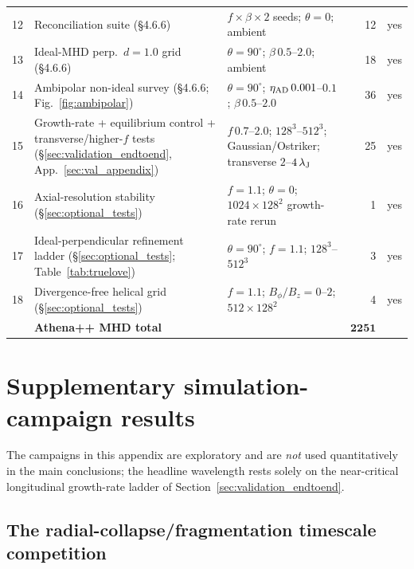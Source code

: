 \documentclass[usenatbib,twoside,twocolumn]{mnras}
\begin{document}
\begin{table}
\begin{tabular}{cllrl}
12 & Reconciliation suite (\S4.6.6) & $f\times\beta\times2$ seeds; $\theta=0$; ambient & 12 & yes \\
13 & Ideal-MHD perp.\ $d=1.0$ grid (\S4.6.6) & $\theta=90^\circ$; $\beta\,0.5$--$2.0$; ambient & 18 & yes \\
14 & Ambipolar non-ideal survey (\S4.6.6; Fig.~\ref{fig:ambipolar}) & $\theta=90^\circ$; $\eta_{\rm AD}\,0.001$--$0.1$; $\beta\,0.5$--$2.0$ & 36 & yes \\
15 & Growth-rate + equilibrium control + transverse/higher-$f$ tests (\S\ref{sec:validation_endtoend}, App.~\ref{sec:val_appendix}) & $f\,0.7$--$2.0$; $128^3$--$512^3$; Gaussian/Ostriker; transverse $2$--$4\,\lambda_{\rm J}$ & 25 & yes \\
16 & Axial-resolution stability (\S\ref{sec:optional_tests}) & $f=1.1$; $\theta=0$; $1024\times128^2$ growth-rate rerun & 1 & yes \\
17 & Ideal-perpendicular refinement ladder (\S\ref{sec:optional_tests}; Table~\ref{tab:truelove}) & $\theta=90^\circ$; $f=1.1$; $128^3$--$512^3$ & 3 & yes \\
18 & Divergence-free helical grid (\S\ref{sec:optional_tests}) & $f=1.1$; $B_\phi/B_z=0$--$2$; $512\times128^2$ & 4 & yes \\
\midrule
   & \textbf{Athena++ MHD total} & & $\boldsymbol{2251}$ & \\
\bottomrule
\end{tabular}
\end{table}

\section{Supplementary simulation-campaign results}
\label{sec:supplementary_campaigns_app}

The campaigns in this appendix are exploratory and are \emph{not} used quantitatively in the main conclusions; the headline wavelength rests solely on the near-critical longitudinal growth-rate ladder of Section~\ref{sec:validation_endtoend}.

\subsection{The radial-collapse/fragmentation timescale competition}
\label{sec:regimes}
\end{document}
